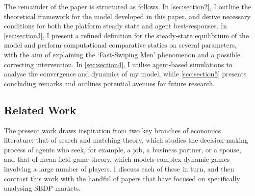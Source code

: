 The remainder of the paper is structured as follows. In \autoref{sec:section2}, I outline the theoretical framework for the model developed in this paper, and derive necessary conditions for both the platform steady state and agent best-responses. In \autoref{sec:section3}, I present a refined definition for the steady-state equilibrium of the model and perform computational comparative statics on several parameters, with the aim of explaining the `Fast-Swiping Men' phenomenon and a possible correcting intervention. In \autoref{sec:section4}, I utilise agent-based simulations to analyse the convergence and dynamics of my model, while \autoref{sec:section5} presents concluding remarks and outlines potential avenues for future research.

\subsection{Related Work}
\label{sec:section1.1}
The present work draws inspiration from two key branches of economics literature: that of search and matching theory, which studies the decision-making process of agents who seek, for example, a job, a business partner, or a spouse, and that of mean-field game theory, which models complex dynamic games involving a large number of players. 
I discuss each of these in turn, and then contrast this work with the handful of papers that have focused on specifically analysing SBDP markets.

